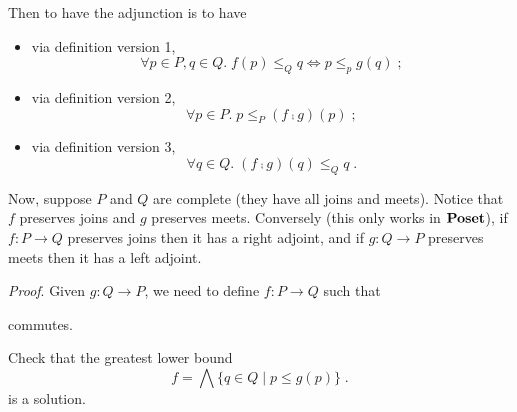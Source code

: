 Then to have the adjunction is to have
\begin{itemize}
\item via definition version 1,
\[\forall p \in P, q \in Q.\; f(p) \le_Q q \iff p \le_p g(q)\;;\]
\item via definition version 2,
\[\forall p \in P.\; p \le_P (f \comp g)(p)\;;\]
\item via definition version 3,
\[\forall q \in Q.\; (f \comp g)(q) \le_Q q\;.\]
\end{itemize}

Now, suppose $P$ and $Q$ are complete (\ie they have all joins and meets).
Notice that $f$ preserves joins and $g$ preserves meets. Conversely (this only
works in $\mathbf {Poset}$), if $f : P \longrightarrow Q$ preserves joins then it has
a right adjoint, and if $g : Q \longrightarrow P$ preserves meets then it has a
left adjoint.

\emph{Proof}. Given $g : Q \longrightarrow P$, we need to define $f : P
\longrightarrow Q$ such that
\begin{center}
\end{center}
commutes.

\begin{exercise}
Check that the greatest lower bound
\[f = \bigwedge \{q \in Q\;|\; p \le g(p)\}\;.\]
is a solution.
\end{exercise}

